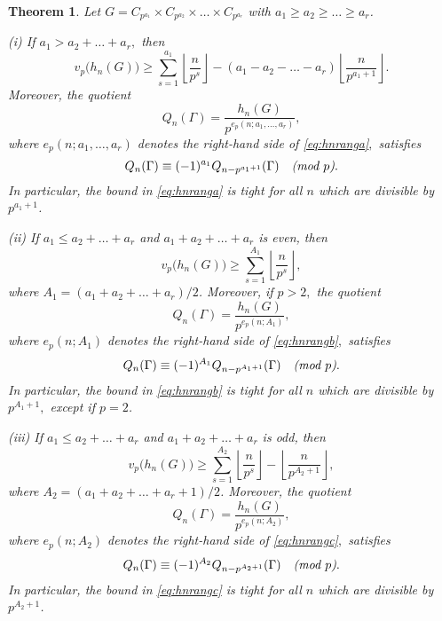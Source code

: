 \documentclass[12pt,reqno]{amsart}
\numberwithin{equation}{section}
\newtheorem{theorem}{Theorem}
\theoremstyle{remark}
\begin{document}
\begin{theorem} \label{thm:rang}
Let\/ $G=C_{p^{a_1}}\times C_{p^{a_2}}\times\dots \times
C_{p^{a_r}}$ with $a_1\ge a_2\ge \dots \ge a_r$. 

{\em (i)} If $a_1> a_2+\dots+a_r,$ then
\begin{equation} \label{eq:hnranga} 
v_p\big(h_n(G)\big)\ge
\sum_{s=1}^{a_1}{\left\lfloor{\frac {n} {p^s}}\right\rfloor}
-(a_1-a_2-\dots-a_r){\left\lfloor{\frac {n} {p^{a_1+1}}}\right\rfloor}.
\end{equation}
Moreover, the quotient
\begin{equation*} 
Q_n({\Gamma})=\frac {h_n(G)} 
{p^{e_p(n;a_1,\dots,a_r)}},
\end{equation*}
where $e_p(n;a_1,\dots,a_r)$ 
denotes the right-hand side of \eqref{eq:hnranga}$,$
satisfies
\begin{equation} \label{eq:Qrek1ra} 
Q_n({\Gamma})\equiv (-1)^{a_1}Q_{n-p^{a_1+1}}({\Gamma}) 
\quad \text{\em (mod $p$)}.
\end{equation}
In particular, the bound in \eqref{eq:hnranga} is tight for all $n$ which are
divisible by $p^{a_1+1}$.

{\em (ii)} If $a_1\le a_2+\dots+a_r$ and $a_1+a_2+\dots+a_r$ is even, then
\begin{equation} \label{eq:hnrangb} 
v_p\big(h_n(G)\big)\ge
\sum_{s=1}^{A_1}{\left\lfloor{\frac {n} {p^s}}\right\rfloor},
\end{equation}
where $A_1=(a_1+a_2+\dots+a_r)/2$.
Moreover, if $p>2,$ the quotient
\begin{equation*} 
Q_n({\Gamma})=\frac {h_n(G)} 
{p^{e_p(n;A_1)}},
\end{equation*}
where $e_p(n;A_1)$ denotes the right-hand side of \eqref{eq:hnrangb}$,$
satisfies
\begin{equation} \label{eq:Qrek1rb} 
Q_n({\Gamma})\equiv (-1)^{A_1}Q_{n-p^{A_1+1}}({\Gamma}) 
\quad \text{\em (mod $p$)}.
\end{equation}
In particular, the bound in \eqref{eq:hnrangb} is tight for all $n$ which are
divisible by $p^{A_1+1},$ except if $p=2$.

{\em (iii)} If $a_1\le a_2+\dots+a_r$ and $a_1+a_2+\dots+a_r$ is odd, then
\begin{equation} \label{eq:hnrangc} 
v_p\big(h_n(G)\big)\ge
\sum_{s=1}^{A_2}{\left\lfloor{\frac {n} {p^s}}\right\rfloor}-{\left\lfloor{\frac {n} {p^{A_2+1}}}\right\rfloor},
\end{equation}
where $A_2=(a_1+a_2+\dots+a_r+1)/2$.
Moreover, the quotient
\begin{equation*} 
Q_n({\Gamma})=\frac {h_n(G)} 
{p^{e_p(n;A_2)}},
\end{equation*}
where $e_p(n;A_2)$ denotes the right-hand side of \eqref{eq:hnrangc}$,$
satisfies
\begin{equation} \label{eq:Qrek1rc} 
Q_n({\Gamma})\equiv (-1)^{A_2}Q_{n-p^{A_2+1}}({\Gamma}) 
\quad \text{\em (mod $p$)}.
\end{equation}
In particular, the bound in \eqref{eq:hnrangc} is tight for all $n$ which are
divisible by $p^{A_2+1}$.
\end{theorem}
\end{document}
